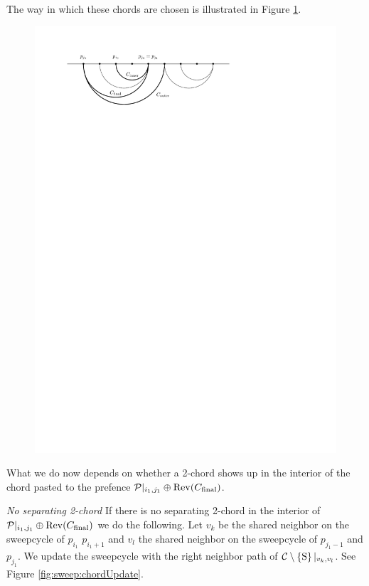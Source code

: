     The way in which these chords are chosen is illustrated in Figure \ref{fig:sweep:chordsOnPrefence}.

    \begin{figure}[h]
      \centering
      \includegraphics[scale=1]{unifiedalgo/img/sweep/chordsOnPrefence}
      \caption{}
      \label{fig:sweep:chordsOnPrefence}
    \end{figure}

    What we do now depends on whether a 2-chord shows up in the interior of the chord pasted to the prefence $\mathcal{P}|_{i_1, j_1} \oplus \operatorname{Rev}({C_\text{final}})$.

    \emph{No separating 2-chord}
    If there is no separating 2-chord in the interior of $\mathcal{P}|_{i_1, j_1} \oplus \operatorname{Rev}({C_\text{final}})$ we do the following. Let $v_k$ be the shared neighbor on the sweepcycle of $p_{i_1}$ $p_{i_1 +1}$ and $v_l$ the shared neighbor on the sweepcycle  of $p_{j_1 -1}$ and $p_{j_1}$. We update the sweepcycle with the right neighbor path of $\mathcal{C} \setminus \left\lbrace {\mathrm{S}} \right\rbrace|_{v_k, v_l}$. See Figure \ref{fig:sweep:chordUpdate}.

